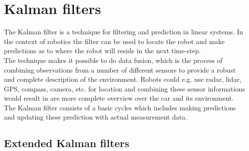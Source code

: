 
\section{Kalman filters}

The Kalman filter is a technique for filtering and prediction in linear systems. In the context of robotics the filter can be used to locate the robot and make predictions as to where the robot will reside in the next time-step.\\
The technique makes it possible to do data fusion, which is the process of combining observations from a number of different sensors to provide a robust and complete description of the environment. Robots could e.g. use radar, lidar, GPS, compass, camera, etc. for location and combining these sensor informations would result in are more complete overview over the car and its environment.\\
The Kalman filter consists of a basic cycles which includes making predictions and updating these prediction with actual measurement data.

\subsection{Extended Kalman filters}